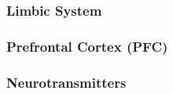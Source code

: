 \documentclass[man]{apa}
\begin{document}

\subsubsection{Limbic System}

\subsubsection{Prefrontal Cortex (PFC)}


\subsubsection{Neurotransmitters}
\end{document}
